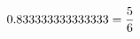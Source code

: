 \documentclass[preview]{standalone}
\begin{document}
\begin{align*}
\special{dvisvgm:raw <g id='unique000'>}0.833333333333333 = \frac{5}{6}\special{dvisvgm:raw </g>}
\end{align*}
\end{document}

